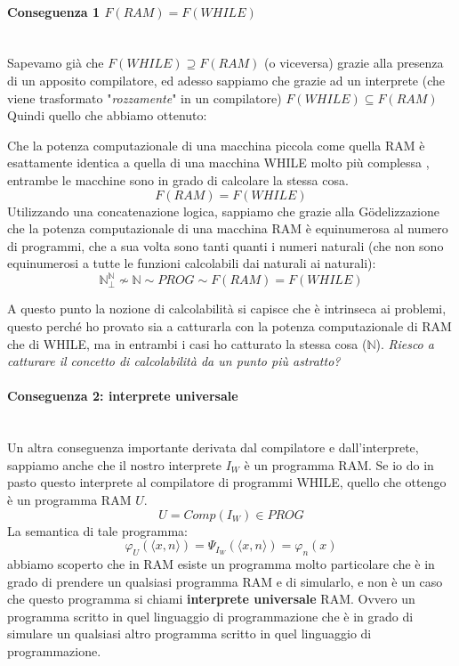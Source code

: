 \documentclass{article}
\begin{document}
\paragraph{Conseguenza 1 $F(RAM)=F(WHILE)$}\mbox{}\\
Sapevamo già che $F(WHILE)\supseteq F(RAM)$ (o viceversa) grazie alla presenza
di un apposito compilatore, ed adesso sappiamo che grazie ad un interprete
(che viene trasformato "\textit{rozzamente}" in un compilatore) $F(WHILE)\subseteq F(RAM)$
Quindi quello che abbiamo ottenuto:

Che la potenza computazionale di una macchina piccola come quella RAM è esattamente
identica a quella di una macchina WHILE molto più complessa , entrambe le macchine sono in
grado di calcolare la stessa cosa.
$$F(RAM)=F(WHILE)$$
Utilizzando una concatenazione logica, sappiamo che
grazie alla Gödelizzazione che la potenza computazionale di una macchina RAM è equinumerosa
al numero di programmi, che a sua volta sono tanti quanti i numeri naturali (che non sono
equinumerosi a tutte le funzioni calcolabili dai naturali ai naturali):
$$\mathbb{N}^{\mathbb{N}}_\bot\nsim\mathbb{N}\sim PROG \sim F(RAM)=F(WHILE)$$

A questo punto la nozione di calcolabilità si capisce che è intrinseca ai problemi,
questo perché ho provato sia a catturarla con la potenza computazionale di RAM che di WHILE,
ma in entrambi i casi ho catturato la stessa cosa ($\mathbb{N}$). \textit{Riesco
    a catturare il concetto di calcolabilità da un punto più astratto?}

\paragraph{Conseguenza 2: interprete universale}\mbox{}\\
Un altra conseguenza importante derivata dal compilatore e dall'interprete, sappiamo
anche che il nostro interprete $I_W$ è un programma RAM. Se io do in pasto questo
interprete al compilatore di programmi WHILE, quello che ottengo è un programma
RAM $U$.
$$U=Comp(I_W)\in PROG$$
La semantica di tale programma:
$$\varphi_U\left(\langle x,n\rangle\right)=\Psi_{I_W}\left(\langle x,n\rangle\right)=\varphi_n\left( x\right)$$
abbiamo scoperto che in RAM esiste un programma molto particolare che è in
grado di prendere un qualsiasi programma RAM e di simularlo, e non è un caso che
questo programma si chiami \textbf{interprete universale} RAM. Ovvero un programma
scritto in quel linguaggio di programmazione che è in grado di simulare un qualsiasi
altro programma scritto in quel linguaggio di programmazione.
\end{document}
